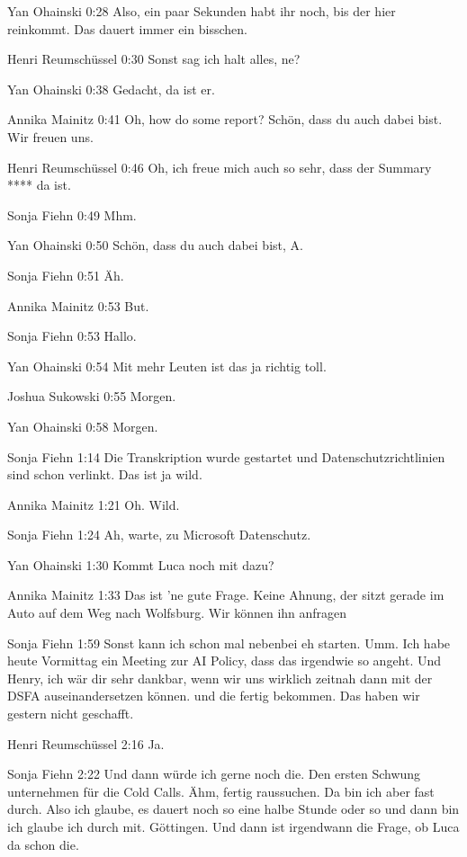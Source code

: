 Yan Ohainski   0:28
Also, ein paar Sekunden habt ihr noch, bis der hier reinkommt. Das dauert immer ein bisschen.

Henri Reumschüssel   0:30
Sonst sag ich halt alles, ne?

Yan Ohainski   0:38
Gedacht, da ist er.

Annika Mainitz   0:41
Oh, how do some report?
Schön, dass du auch dabei bist. Wir freuen uns.

Henri Reumschüssel   0:46
Oh, ich freue mich auch so sehr, dass der Summary **** da ist.

Sonja Fiehn   0:49
Mhm.

Yan Ohainski   0:50
Schön, dass du auch dabei bist, A.

Sonja Fiehn   0:51
Äh.

Annika Mainitz   0:53
But.

Sonja Fiehn   0:53
Hallo.

Yan Ohainski   0:54
Mit mehr Leuten ist das ja richtig toll.

Joshua Sukowski   0:55
Morgen.

Yan Ohainski   0:58
Morgen.

Sonja Fiehn   1:14
Die Transkription wurde gestartet und Datenschutzrichtlinien sind schon verlinkt. Das ist ja wild.

Annika Mainitz   1:21
Oh.
Wild.

Sonja Fiehn   1:24
Ah, warte, zu Microsoft Datenschutz.

Yan Ohainski   1:30
Kommt Luca noch mit dazu?

Annika Mainitz   1:33
Das ist 'ne gute Frage. Keine Ahnung, der sitzt gerade im Auto auf dem Weg nach Wolfsburg.
Wir können ihn anfragen

Sonja Fiehn   1:59
Sonst kann ich schon mal nebenbei eh starten.
Umm.
Ich habe heute Vormittag ein Meeting zur AI Policy, dass das irgendwie so angeht. Und Henry, ich wär dir sehr dankbar, wenn wir uns wirklich zeitnah dann mit der DSFA auseinandersetzen können. und die fertig bekommen. Das haben wir gestern nicht geschafft.

Henri Reumschüssel   2:16
Ja.

Sonja Fiehn   2:22
Und dann würde ich gerne noch die.
Den ersten Schwung unternehmen für die Cold Calls. Ähm, fertig raussuchen. Da bin ich aber fast durch. Also ich glaube, es dauert noch so eine halbe Stunde oder so und dann bin ich glaube ich durch mit. Göttingen.
Und dann ist irgendwann die Frage, ob Luca da schon die.

